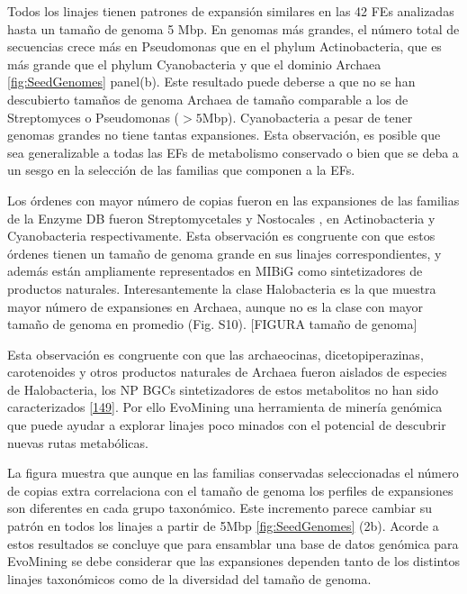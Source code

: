 \documentclass[12pt,twoside]{reedthesis}
\begin{document}
  Todos los linajes tienen patrones de expansión similares en las 42 FEs
  analizadas hasta un tamaño de genoma 5 Mbp. En genomas más grandes, el
  número total de secuencias crece más en Pseudomonas que en el phylum
  Actinobacteria, que es más grande que el phylum Cyanobacteria y que el
  dominio Archaea \autoref{fig:SeedGenomes} panel(b). Este resultado puede
  deberse a que no se han descubierto tamaños de genoma Archaea de tamaño
  comparable a los de Streptomyces o Pseudomonas (\(> 5\)Mbp).
  Cyanobacteria a pesar de tener genomas grandes no tiene tantas
  expansiones. Esta observación, es posible que sea generalizable a todas
  las EFs de metabolismo conservado o bien que se deba a un sesgo en la
  selección de las familias que componen a la EFs.
  
  Los órdenes con mayor número de copias fueron en las expansiones de las
  familias de la Enzyme DB fueron Streptomycetales y Nostocales , en
  Actinobacteria y Cyanobacteria respectivamente. Esta observación es
  congruente con que estos órdenes tienen un tamaño de genoma grande en
  sus linajes correspondientes, y además están ampliamente representados
  en MIBiG como sintetizadores de productos naturales. Interesantemente la
  clase Halobacteria es la que muestra mayor número de expansiones en
  Archaea, aunque no es la clase con mayor tamaño de genoma en promedio
  (Fig. S10). {[}FIGURA tamaño de genoma{]}
  
  Esta observación es congruente con que las archaeocinas,
  dicetopiperazinas, carotenoides y otros productos naturales de Archaea
  fueron aislados de especies de Halobacteria, los NP BGCs sintetizadores
  de estos metabolitos no han sido caracterizados
  {[}\protect\hyperlink{ref-charlesworth_untapped_natural_products_Archaea_2015}{149}{]}.
  Por ello EvoMining una herramienta de minería genómica que puede ayudar
  a explorar linajes poco minados con el potencial de descubrir nuevas
  rutas metabólicas.
  
  La figura muestra que aunque en las familias conservadas seleccionadas
  el número de copias extra correlaciona con el tamaño de genoma los
  perfiles de expansiones son diferentes en cada grupo taxonómico. Este
  incremento parece cambiar su patrón en todos los linajes a partir de
  5Mbp \autoref{fig:SeedGenomes} (2b). Acorde a estos resultados se
  concluye que para ensamblar una base de datos genómica para EvoMining se
  debe considerar que las expansiones dependen tanto de los distintos
  linajes taxonómicos como de la diversidad del tamaño de genoma.
  
\end{document}
